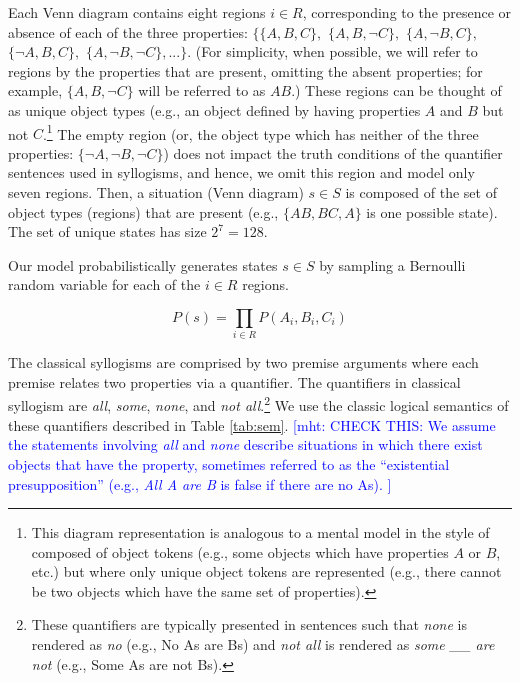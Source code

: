 \documentclass[floatsintext, doc]{apa6}
\newcommand{\mht}[1]{{\textcolor{Blue}{[mht: #1]}}}
\begin{document}
Each Venn diagram contains eight regions $i \in R$, corresponding to the presence or absence of each of the three properties: $\{\{A,B,C\},$ $\{A,B,\neg C\},$ $\{A,\neg B,C\},$ $\{\neg A, B, C\},$ $\{A, \neg B, \neg C\},...\}$. (For simplicity, when possible, we will refer to regions by the properties that are present, omitting the absent properties; for example, $\{A, B, \neg C\}$ will be referred to as $AB$.)
These regions can be thought of as unique object types (e.g., an object defined by having properties $A$ and $B$ but not $C$.\footnote{This diagram representation is analogous to a mental model in the style of  composed of object tokens (e.g., some objects which have properties $A$ or $B$, etc.) but where only unique object tokens are represented (e.g., there cannot be two objects which have the same set of properties).}
The empty region (or, the object type which has neither of the three properties: $\{\neg A, \neg B, \neg C\}$) does not impact the truth conditions of the quantifier sentences used in syllogisms, and hence, we omit this region and model only seven regions.
Then, a situation (Venn diagram) $s \in S$ is composed of the set of object types (regions) that are present (e.g., $\{AB, BC, A\}$ is one possible state).
The set of unique states has size $2^7 = 128$.

Our model probabilistically generates states $s \in S$ by sampling a Bernoulli random variable for each of the $i \in R$ regions. 

$$P(s) = \prod_{i \in R} P(A_{i}, B_{i}, C_{i}) $$%

The classical syllogisms are comprised by two premise arguments where each premise relates two properties via a quantifier. 
The quantifiers in classical syllogism are \emph{all}, \emph{some}, \emph{none}, and \emph{not all}.\footnote{
These quantifiers are typically presented in sentences such that \emph{none} is rendered as \emph{no} (e.g., No As are Bs) and \emph{not all} is rendered as \emph{some \_\_ are not} (e.g., Some As are not Bs).
}
We use the classic logical semantics of these quantifiers described in Table \ref{tab:sem}.
\mht{CHECK THIS:
We assume the statements involving \emph{all} and \emph{none} describe situations in which there exist objects that have the property, sometimes referred to as the ``existential presupposition'' (e.g., \emph{All A are B} is false if there are no As). 
}
\end{document}
